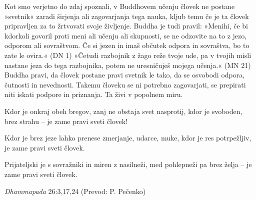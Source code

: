 Kot smo verjetno do zdaj spoznali, v Buddhovem učenju človek ne
postane »svetnik« zaradi širjenja ali zagovarjanja tega nauka, kljub
temu če je ta človek pripravljen za to žrtvovati svoje življenje. Buddha
je tudi pravil: »Menihi, če bi kdorkoli govoril proti meni ali učenju
ali skupnosti, se ne odzovite na to z jezo, odporom ali sovraštvom. Če
si jezen in imaš občutek odpora in sovraštva, bo to zate le ovira.« (DN
1) »Četudi razbojnik z žago reže tvoje ude, pa v tvojih misli nastane
jeza do tega razbojnika, potem ne uresničuješ mojega učenja.« (MN 21)
Buddha pravi, da človek postane pravi svetnik le tako, da se osvobodi
odpora, čutnosti in nevednosti. Takemu človeku se ni potrebno
zagovarjati, se prepirati niti iskati podpore in priznanja. Ta živi v
popolnem miru.

Kdor je onkraj obeh bregov, zanj ne obstaja svet nasprotij, kdor je
svoboden, brez strahu -- je zame pravi sveti človek!

Kdor je brez jeze lahko prenese zmerjanje, udarce, muke, kdor je res
potrpežljiv, je zame pravi sveti človek.

Prijateljski je s sovražniki in miren z nasilneži, med pohlepneži pa
brez želja -- je zame pravi sveti človek.

\emph{Dhammapada} 26:3,17,24 (Prevod: P. Pečenko)

